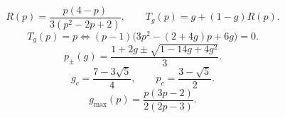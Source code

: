 \[
R(p)=\frac{p(4-p)}{3(p^2-2p+2)},
\qquad
T_g(p)=g+(1-g)R(p).
\]
\[
T_g(p)=p
\iff
(p-1)\bigl(3p^2-(2+4g)p+6g\bigr)=0.
\]
\[
p_{\pm}(g)=\frac{1+2g\pm\sqrt{1-14g+4g^2}}{3}.
\]
\[
g_c=\frac{7-3\sqrt5}{4},
\qquad
p_c=\frac{3-\sqrt5}{2}.
\]
\[
g_{\max}(p)=\frac{p(3p-2)}{2(2p-3)}.
\]
